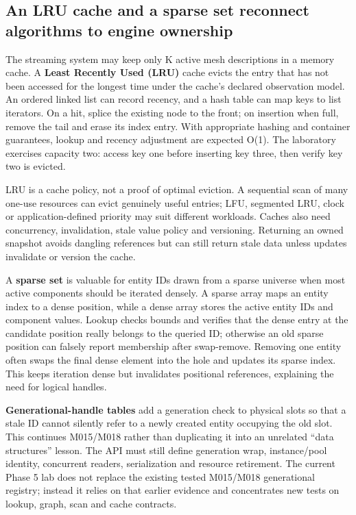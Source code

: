 \subsection{An LRU cache and a sparse set reconnect algorithms to engine ownership}\label{01-foundations-i-ch008-an-lru-cache-and-a-sparse-set-reconnect-algorithms-to-engine-ownership}

The streaming system may keep only K active mesh descriptions in a memory cache. A \textbf{Least Recently Used (LRU)} cache evicts the entry that has not been accessed for the longest time under the cache's declared observation model. An ordered linked list can record recency, and a hash table can map keys to list iterators. On a hit, splice the existing node to the front; on insertion when full, remove the tail and erase its index entry. With appropriate hashing and container guarantees, lookup and recency adjustment are expected O(1). The laboratory exercises capacity two: access key one before inserting key three, then verify key two is evicted.

LRU is a cache policy, not a proof of optimal eviction. A sequential scan of many one-use resources can evict genuinely useful entries; LFU, segmented LRU, clock or application-defined priority may suit different workloads. Caches also need concurrency, invalidation, stale value policy and versioning. Returning an owned snapshot avoids dangling references but can still return stale data unless updates invalidate or version the cache.

A \textbf{sparse set} is valuable for entity IDs drawn from a sparse universe when most active components should be iterated densely. A sparse array maps an entity index to a dense position, while a dense array stores the active entity IDs and component values. Lookup checks bounds and verifies that the dense entry at the candidate position really belongs to the queried ID; otherwise an old sparse position can falsely report membership after swap-remove. Removing one entity often swaps the final dense element into the hole and updates its sparse index. This keeps iteration dense but invalidates positional references, explaining the need for logical handles.

\textbf{Generational-handle tables} add a generation check to physical slots so that a stale ID cannot silently refer to a newly created entity occupying the old slot. This continues M015/M018 rather than duplicating it into an unrelated ``data structures'' lesson. The API must still define generation wrap, instance/pool identity, concurrent readers, serialization and resource retirement. The current Phase 5 lab does not replace the existing tested M015/M018 generational registry; instead it relies on that earlier evidence and concentrates new tests on lookup, graph, scan and cache contracts.

